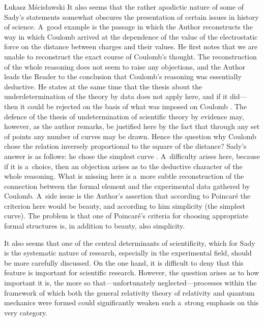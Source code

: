 \begin{newrevengenv}{Łukasz Mścisławski}
It also seems that the rather apodictic nature of some of Sady's statements somewhat obscures the presentation of certain issues in history of science. A~good example is the passage in which the Author reconstructs the way in which Coulomb arrived at the dependence of the value of the electrostatic force on the distance between charges and their values. He first notes that we are unable to reconstruct the exact course of Coulomb's thought. The reconstruction of the whole reasoning does not seem to raise any objections, and the Author leads the Reader to the conclusion that Coulomb's reasoning was essentially deductive. He states at the same time that the thesis about the underdetermination of the theory by data does not apply here, and if it did---then it could be rejected on the basis of what was imposed on Coulomb
\parencite[][pp.32--33]{sady_struktura_2020}. %
 The defence of the thesis of undetermination of scientific theory by evidence may, however, as the author remarks, be justified here by the fact that through any set of points any number of curves may be drawn. Hence the question why Coulomb chose the relation inversely proportional to the square of the distance? Sady's answer is as follows: he chose the simplest curve 
\parencite[][pp.32--33]{sady_struktura_2020}. %
 A~difficulty arises here, because if it is a~choice, then an objection arises as to the deductive character of the whole reasoning. What is missing here is a~more subtle reconstruction of the connection between the formal element and the experimental data gathered by Coulomb. A~side issue is the Author's assertion that according to Poincaré the criterion here would be beauty, and according to him simplicity (the simplest curve). The problem is that one of Poincaré's criteria for choosing appropriate formal structures is, in addition to beauty, also simplicity.

It also seems that one of the central determinants of scientificity, which for Sady is the systematic nature of research, especially in the experimental field, should be more carefully discussed. On the one hand, it is difficult to deny that this feature is important for scientific research. However, the question arises as to how important it is, the more so that---unfortunately neglected---processes within the framework of which both the general relativity theory of relativity and quantum mechanics were formed could significantly weaken such a~strong emphasis on this very category.


\end{newrevengenv}
